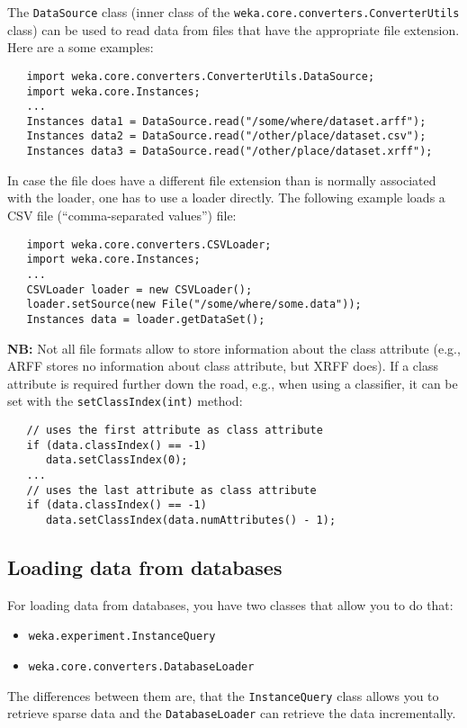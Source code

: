 The \texttt{DataSource} class (inner class of the
\texttt{weka.core.converters.ConverterUtils} class) can be used to read data
from files that have the appropriate file extension. Here are a some examples:
\begin{verbatim}
   import weka.core.converters.ConverterUtils.DataSource;
   import weka.core.Instances;
   ...
   Instances data1 = DataSource.read("/some/where/dataset.arff");
   Instances data2 = DataSource.read("/other/place/dataset.csv");
   Instances data3 = DataSource.read("/other/place/dataset.xrff");
\end{verbatim}
In case the file does have a different file extension than is normally
associated with the loader, one has to use a loader directly. The following
example loads a CSV file (``comma-separated values'') file:
\begin{verbatim}
   import weka.core.converters.CSVLoader;
   import weka.core.Instances;
   ...
   CSVLoader loader = new CSVLoader();
   loader.setSource(new File("/some/where/some.data"));
   Instances data = loader.getDataSet();
\end{verbatim}
\textbf{NB:} Not all file formats allow to store information about the class
attribute (e.g., ARFF stores no information about class attribute, but XRFF
does). If a class attribute is required further down the road, e.g., when using
a classifier, it can be set with the \texttt{setClassIndex(int)} method:
\begin{verbatim}
   // uses the first attribute as class attribute
   if (data.classIndex() == -1)
      data.setClassIndex(0);
   ...
   // uses the last attribute as class attribute
   if (data.classIndex() == -1)
      data.setClassIndex(data.numAttributes() - 1);
\end{verbatim}

\subsection{Loading data from databases}
For loading data from databases, you have two classes that allow you to do that:
\begin{itemize}
	\item \texttt{weka.experiment.InstanceQuery}
	\item \texttt{weka.core.converters.DatabaseLoader}
\end{itemize}
The differences between them are, that the \texttt{InstanceQuery} class allows
you to retrieve sparse data and the \texttt{DatabaseLoader} can retrieve the
data incrementally.

